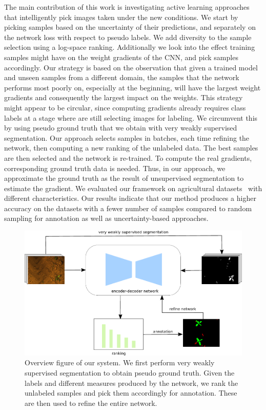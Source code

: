 \documentclass[letterpaper, 10 pt, conference]{ieeeconf}  %
\begin{document}
The main contribution of this work is investigating active learning approaches that
intelligently pick images taken under the new conditions. We start by picking samples based 
on the uncertainty of their predictions, and separately on the network loss with respect 
to pseudo labels. We add diversity to the sample selection using a log-space ranking.
Additionally we look into the effect training samples might have on the weight gradients of the CNN,
and pick samples accordingly.
Our strategy is based  on the observation that given a trained model and unseen
samples from  a different domain, the samples that the network performs most
poorly on, especially at the  beginning, will have the largest weight
gradients and consequently the largest impact on the  weights. This strategy might appear to be circular, since computing gradients already requires class labels at a stage where are still selecting images for labeling.  We circumvent this by using pseudo ground truth that we obtain with very weakly supervised segmentation. Our approach
selects samples in batches, each time refining the network, then computing a
new  ranking of the unlabeled data. The best samples are then selected and the
network is re-trained. To compute the real gradients, corresponding ground
truth data is needed. Thus, in our approach, we approximate the ground truth as the result of unsupervised segmentation to estimate the gradient.  We
evaluated our framework on  agricultural datasets~\cite{chebrolu2017agricultural} 
with different characteristics.  Our results indicate that our method produces a
higher accuracy on the datasets with a fewer  number of samples compared to
random sampling for annotation as well as uncertainty-based approaches.


    \begin{figure}
    \vspace{1em}
    \centering
    \includegraphics[scale=0.9]{pics/output_system_overview.pdf}
   		\caption{Overview figure of our system. We first perform very weakly supervised segmentation to obtain pseudo ground truth. Given the labels and different measures produced by the network, we rank the unlabeled samples and pick them accordingly for annotation. These are then used to refine the entire network.}
		\label{fig:overview}    		
   \end{figure}
   
\end{document}
